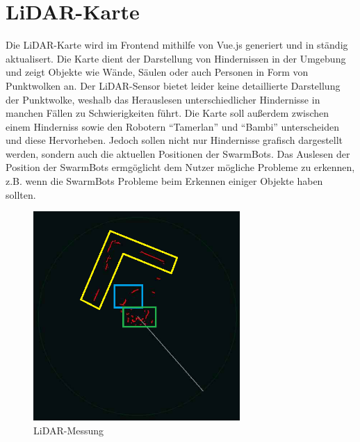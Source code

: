 \section{LiDAR-Karte}
\label{subsec:frontend_lidar_map}
Die LiDAR-Karte wird im Frontend mithilfe von Vue.js generiert und in ständig aktualisert. 
Die Karte dient der Darstellung von Hindernissen in der Umgebung und zeigt Objekte wie Wände, 
Säulen oder auch Personen in Form von Punktwolken an. 
%
Der LiDAR-Sensor bietet leider keine detaillierte Darstellung der Punktwolke, 
weshalb das Herauslesen unterschiedlicher Hindernisse in manchen Fällen zu Schwierigkeiten führt. 
%
Die Karte soll außerdem zwischen einem Hinderniss sowie den Robotern ``Tamerlan'' und ``Bambi'' 
unterscheiden und diese Hervorheben. 
%
Jedoch sollen nicht nur Hindernisse grafisch dargestellt werden, 
sondern auch die aktuellen Positionen der SwarmBots.
%
Das Auslesen der Position der SwarmBots ermgöglicht dem Nutzer mögliche Probleme zu erkennen, 
z.B. wenn die SwarmBots Probleme beim Erkennen einiger Objekte haben sollten.  

\begin{figure}[H]
    \includegraphics[width=0.7\textwidth, center]{img/LiDARMessungZeichnung_alt.png}
    \caption{LiDAR-Messung}
    \label{fig:LiDAR-Messung}
\end{figure}

